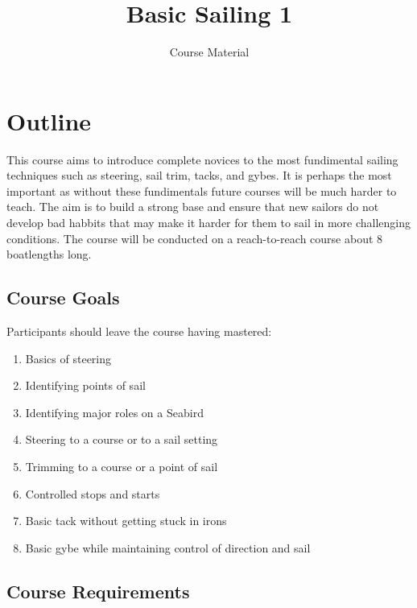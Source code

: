\documentclass[12pt]{scrartcl}
\title{Basic Sailing 1}
\subtitle{Course Material}
\date{}
\begin{document}
\maketitle

\thispagestyle{empty}

\tableofcontents

\newpage

\section{Outline} \label{sec:outline}

This course aims to introduce complete novices to the most fundimental sailing techniques such as steering, sail trim, tacks, and gybes. It is perhaps the most important as without these fundimentals future courses will be much harder to teach. The aim is to build a strong base and ensure that new sailors do not develop bad habbits that may make it harder for them to sail in more challenging conditions. The course will be conducted on a reach-to-reach course about 8 boatlengths long.

\subsection{Course Goals} \label{subsec:course goals}

Participants should leave the course having mastered:

\label{list:goals}
\begin{enumerate}
	\item Basics of steering
	\item Identifying points of sail
	\item Identifying major roles on a Seabird
	\item Steering to a course or to a sail setting
	\item Trimming to a course or a point of sail
	\item Controlled stops and starts
	\item Basic tack without getting stuck in irons
	\item Basic gybe while maintaining control of direction and sail
\end{enumerate}

\subsection{Course Requirements} \label{subsec:course requirements}
\end{document}
